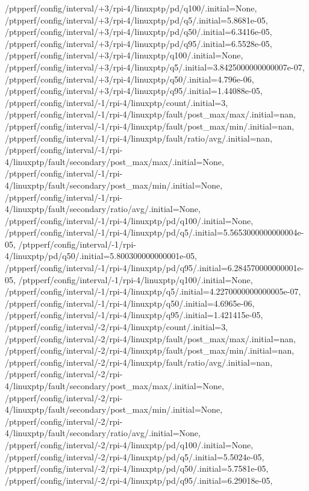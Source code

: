 {    /ptpperf/config/interval/+3/rpi-4/linuxptp/pd/q100/.initial=None,
    /ptpperf/config/interval/+3/rpi-4/linuxptp/pd/q5/.initial=5.8681e-05,
    /ptpperf/config/interval/+3/rpi-4/linuxptp/pd/q50/.initial=6.3416e-05,
    /ptpperf/config/interval/+3/rpi-4/linuxptp/pd/q95/.initial=6.5528e-05,
    /ptpperf/config/interval/+3/rpi-4/linuxptp/q100/.initial=None,
    /ptpperf/config/interval/+3/rpi-4/linuxptp/q5/.initial=3.8425000000000007e-07,
    /ptpperf/config/interval/+3/rpi-4/linuxptp/q50/.initial=4.796e-06,
    /ptpperf/config/interval/+3/rpi-4/linuxptp/q95/.initial=1.44088e-05,
    /ptpperf/config/interval/-1/rpi-4/linuxptp/count/.initial=3,
    /ptpperf/config/interval/-1/rpi-4/linuxptp/fault/post_max/max/.initial=nan,
    /ptpperf/config/interval/-1/rpi-4/linuxptp/fault/post_max/min/.initial=nan,
    /ptpperf/config/interval/-1/rpi-4/linuxptp/fault/ratio/avg/.initial=nan,
    /ptpperf/config/interval/-1/rpi-4/linuxptp/fault/secondary/post_max/max/.initial=None,
    /ptpperf/config/interval/-1/rpi-4/linuxptp/fault/secondary/post_max/min/.initial=None,
    /ptpperf/config/interval/-1/rpi-4/linuxptp/fault/secondary/ratio/avg/.initial=None,
    /ptpperf/config/interval/-1/rpi-4/linuxptp/pd/q100/.initial=None,
    /ptpperf/config/interval/-1/rpi-4/linuxptp/pd/q5/.initial=5.5653000000000004e-05,
    /ptpperf/config/interval/-1/rpi-4/linuxptp/pd/q50/.initial=5.800300000000001e-05,
    /ptpperf/config/interval/-1/rpi-4/linuxptp/pd/q95/.initial=6.284570000000001e-05,
    /ptpperf/config/interval/-1/rpi-4/linuxptp/q100/.initial=None,
    /ptpperf/config/interval/-1/rpi-4/linuxptp/q5/.initial=4.2270000000000005e-07,
    /ptpperf/config/interval/-1/rpi-4/linuxptp/q50/.initial=4.6965e-06,
    /ptpperf/config/interval/-1/rpi-4/linuxptp/q95/.initial=1.421415e-05,
    /ptpperf/config/interval/-2/rpi-4/linuxptp/count/.initial=3,
    /ptpperf/config/interval/-2/rpi-4/linuxptp/fault/post_max/max/.initial=nan,
    /ptpperf/config/interval/-2/rpi-4/linuxptp/fault/post_max/min/.initial=nan,
    /ptpperf/config/interval/-2/rpi-4/linuxptp/fault/ratio/avg/.initial=nan,
    /ptpperf/config/interval/-2/rpi-4/linuxptp/fault/secondary/post_max/max/.initial=None,
    /ptpperf/config/interval/-2/rpi-4/linuxptp/fault/secondary/post_max/min/.initial=None,
    /ptpperf/config/interval/-2/rpi-4/linuxptp/fault/secondary/ratio/avg/.initial=None,
    /ptpperf/config/interval/-2/rpi-4/linuxptp/pd/q100/.initial=None,
    /ptpperf/config/interval/-2/rpi-4/linuxptp/pd/q5/.initial=5.5024e-05,
    /ptpperf/config/interval/-2/rpi-4/linuxptp/pd/q50/.initial=5.7581e-05,
    /ptpperf/config/interval/-2/rpi-4/linuxptp/pd/q95/.initial=6.29018e-05,
}
